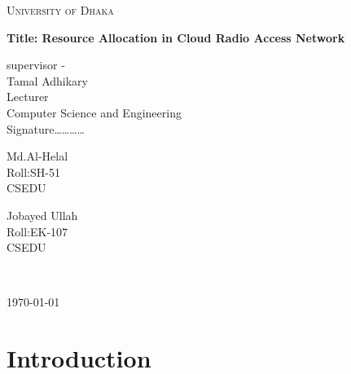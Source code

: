 \documentclass{article}
\begin{document}

\begin{titlepage}
\centering
{\scshape\LARGE University of Dhaka \par}
\vspace{1.5cm}
{\huge\bfseries Title: Resource Allocation in Cloud Radio Access Network\par}
\vspace{2cm}
supervisor -\\
\vspace{.5cm}
Tamal Adhikary\\
Lecturer\\
Computer Science and Engineering\\
Signature\ldots\ldots\ldots\ldots\\
\vspace{3cm}
  \parbox{3cm}{
\centering Md.Al-Helal\\Roll:SH-51\\CSEDU}\hspace{4cm}
\parbox{3cm}{
{\centering Jobayed Ullah\\Roll:EK-107\\CSEDU}}\\
%
\vfill
{\large \today\par}
\end{titlepage}

\section{Introduction}
\end{document}
